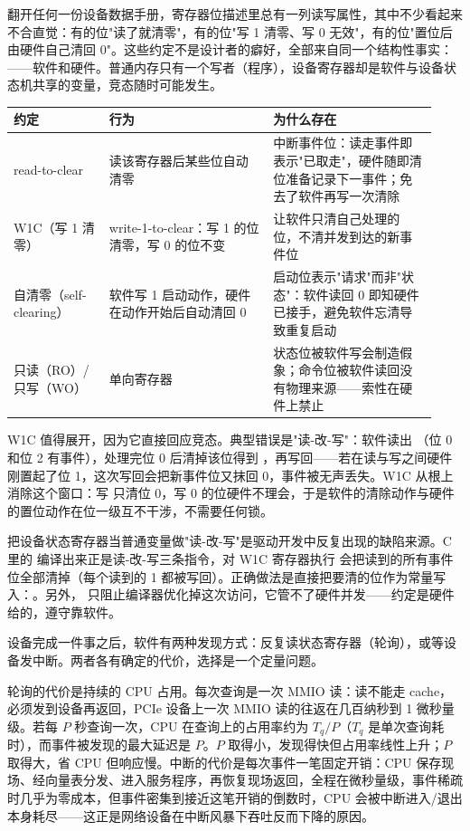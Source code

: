 翻开任何一份设备数据手册，寄存器位描述里总有一列读写属性，其中不少看起来不合直觉：有的位"读了就清零"，有的位"写 1 清零、写 0 无效"，有的位"置位后由硬件自己清回 0"。这些约定不是设计者的癖好，全部来自同一个结构性事实：——软件和硬件。普通内存只有一个写者（程序），设备寄存器却是软件与设备状态机共享的变量，竞态随时可能发生。

\begin{longtable}{L{0.21\linewidth}L{0.36\linewidth}L{0.36\linewidth}}
\toprule
约定 & 行为 & 为什么存在 \\
\midrule
read-to-clear & 读该寄存器后某些位自动清零 & 中断事件位：读走事件即表示"已取走"，硬件随即清位准备记录下一事件；免去了软件再写一次清除 \\
W1C（写 1 清零） & write-1-to-clear：写 1 的位清零，写 0 的位不变 & 让软件只清自己处理的位，不清并发到达的新事件位 \\
自清零（self-clearing） & 软件写 1 启动动作，硬件在动作开始后自动清回 0 & 启动位表示"请求"而非"状态"：软件读回 0 即知硬件已接手，避免软件忘清导致重复启动 \\
只读（RO）/ 只写（WO） & 单向寄存器 & 状态位被软件写会制造假象；命令位被软件读回没有物理来源——索性在硬件上禁止 \\
\bottomrule
\end{longtable}

W1C 值得展开，因为它直接回应竞态。典型错误是"读-改-写"：软件读出 （位 0 和位 2 有事件），处理完位 0 后清掉该位得到 ，再写回——若在读与写之间硬件刚置起了位 1，这次写回会把新事件位又抹回 0，事件被无声丢失。W1C 从根上消除这个窗口：写  只清位 0，写 0 的位硬件不理会，于是软件的清除动作与硬件的置位动作在位一级互不干涉，不需要任何锁。

\begin{warningbox}
把设备状态寄存器当普通变量做"读-改-写"是驱动开发中反复出现的缺陷来源。C 里的  编译出来正是读-改-写三条指令，对 W1C 寄存器执行 \code{|=} 会把读到的所有事件位全部清掉（每个读到的 1 都被写回）。正确做法是直接把要清的位作为常量写入：。另外， 只阻止编译器优化掉这次访问，它管不了硬件并发——约定是硬件给的，遵守靠软件。
\end{warningbox}


设备完成一件事之后，软件有两种发现方式：反复读状态寄存器（轮询），或等设备发中断。两者各有确定的代价，选择是一个定量问题。

轮询的代价是持续的 CPU 占用。每次查询是一次 MMIO 读：读不能走 cache，必须发到设备再返回，PCIe 设备上一次 MMIO 读的往返在几百纳秒到 1 微秒量级。若每 $P$ 秒查询一次，CPU 在查询上的占用率约为 $T_q/P$（$T_q$ 是单次查询耗时），而事件被发现的最大延迟是 $P$。$P$ 取得小，发现得快但占用率线性上升；$P$ 取得大，省 CPU 但响应慢。中断的代价是每次事件一笔固定开销：CPU 保存现场、经向量表分发、进入服务程序，再恢复现场返回，全程在微秒量级，事件稀疏时几乎为零成本，但事件密集到接近这笔开销的倒数时，CPU 会被中断进入/退出本身耗尽——这正是网络设备在中断风暴下吞吐反而下降的原因。

